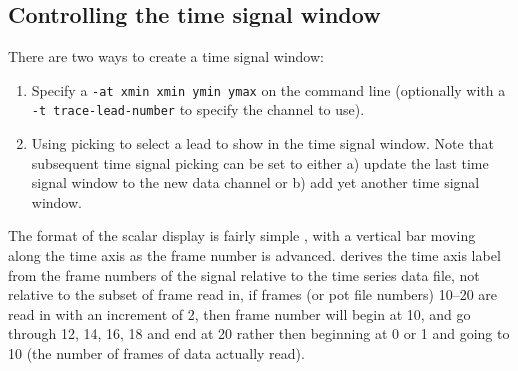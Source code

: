 





\subsection{Controlling the time signal window}
\label{sec:control-scalar} 


There are two ways to create a time signal window:
%
\begin{enumerate}
  \item Specify a \texttt{-at xmin xmin ymin ymax} on the command line
        (optionally with a \texttt{-t trace-lead-number} to specify the
        channel to use).
  \item Using picking to select a lead to show in the time signal window.
        Note that subsequent time signal picking can be set to either a)
        update the last time signal window to the new data channel or b)
        add yet another time signal window.
\end{enumerate}
%

The format of the scalar display is fairly simple 
, with a vertical bar moving along the time axis as the frame number is
advanced.  \map{} derives the time axis label from the frame numbers of the
signal relative to the time series data file, not relative to the subset of
frame read in, \ie{} if frames (or pot file numbers) 10--20 are read in
with an increment of 2, then frame number will begin at 10, and go through
12, 14, 16, 18 and end at 20 rather then beginning at 0 or 1 and going to 10
(the number of frames of data actually read).

